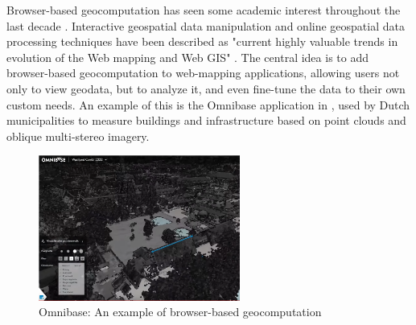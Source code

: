 

Browser-based geocomputation has seen some academic interest throughout the last decade \cite{hamilton_client-side_2014, panidi_hybrid_2015, kulawiak_analysis_2019}.
Interactive geospatial data manipulation and online geospatial data processing techniques have been described as "current highly valuable trends in evolution of the Web mapping and Web GIS" \cite{panidi_hybrid_2015}. 
The central idea is to add browser-based geocomputation to web-mapping applications, allowing users not only to view geodata, but to analyze it, and even fine-tune the data to their own custom needs.
An example of this is the Omnibase application \citep{geodelta_omnibase_2022} in , used by Dutch municipalities to measure buildings and infrastructure based on point clouds and oblique multi-stereo imagery.

\begin{figure}
  \centering
  \graphicspath{ {../../assets/images/background/geo-web/} }
  \includegraphics[width=250px]{omnibase.png}
  \caption{Omnibase: An example of browser-based geocomputation \citep{geodelta_omnibase_2022}}
  \label{fig:1:omnibase}
\end{figure}

